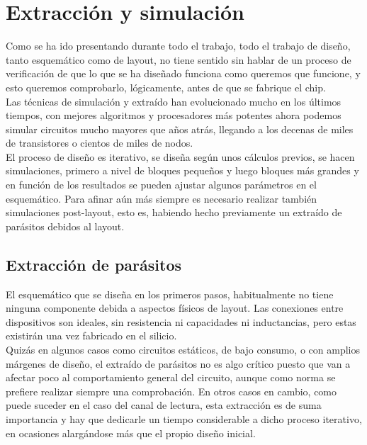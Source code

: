 \chapter{Extracción y simulación}

Como se ha ido presentando durante todo el trabajo, todo el trabajo de diseño,
tanto esquemático como de layout, no tiene sentido sin hablar de un proceso de
verificación de que lo que se ha diseñado funciona como queremos que funcione,
y esto queremos comprobarlo, lógicamente, antes de que se fabrique el chip.\\

Las técnicas de simulación y extraído han evolucionado mucho en los últimos tiempos,
con mejores algoritmos y procesadores más potentes ahora podemos simular circuitos
mucho mayores que años atrás, llegando a los decenas de miles de transistores o
cientos de miles de nodos.\\

El proceso de diseño es iterativo, se diseña según unos cálculos previos, se hacen
simulaciones, primero a nivel de bloques pequeños y luego bloques más grandes y
en función de los resultados se pueden ajustar algunos parámetros en el esquemático.
Para afinar aún más siempre es necesario realizar también simulaciones post-layout,
esto es, habiendo hecho previamente un extraído de parásitos debidos al layout.\\

\section{Extracción de parásitos}\label{cap:extraccion}

El esquemático que se diseña en los primeros pasos, habitualmente no tiene ninguna
componente debida a aspectos físicos de layout. Las conexiones entre dispositivos
son ideales, sin resistencia ni capacidades ni inductancias, pero estas existirán
una vez fabricado en el silicio.\\

Quizás en algunos casos como circuitos estáticos, de bajo consumo, o con amplios
márgenes de diseño, el extraído de parásitos no es algo crítico puesto que van a
afectar poco al comportamiento general del circuito, aunque como norma se prefiere
realizar siempre una comprobación. En otros casos en cambio, como puede suceder
en el caso del canal de lectura, esta extracción es de suma importancia y hay
que dedicarle un tiempo considerable a dicho proceso iterativo, en ocasiones
alargándose más que el propio diseño inicial.\\

